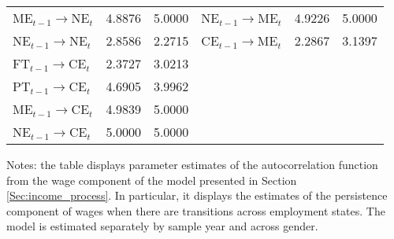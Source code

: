 \documentclass[12pt, a4paper]{article}
\begin{document}
\begin{table}[!htbp]
{{\begin{threeparttable}
\begin{tabular} {@{} l | c  c | l | c  c | @{}}
ME$_{t-1}$$\rightarrow$NE$_{t}$&4.8876	&5.0000&NE$_{t-1}$$\rightarrow$ME$_{t}$	&4.9226	&5.0000	\\[1mm]
NE$_{t-1}$$\rightarrow$NE$_{t}$&2.8586	&2.2715&CE$_{t-1}$$\rightarrow$ME$_{t}$	&2.2867	&3.1397	\\[1mm]
					\hline
FT$_{t-1}$$\rightarrow$CE$_{t}$&2.3727	&3.0213	&&&	\\[1mm]
PT$_{t-1}$$\rightarrow$CE$_{t}$&4.6905	&3.9962	&&&	\\[1mm]
ME$_{t-1}$$\rightarrow$CE$_{t}$&4.9839	&5.0000	&&&	\\[1mm]
NE$_{t-1}$$\rightarrow$CE$_{t}$&5.0000	&5.0000	&&&	\\[1mm]
\hline
				\end{tabular}
				\begin{tablenotes}
					\item {Notes: the table displays parameter estimates of the autocorrelation function from the wage component of the model presented in Section \ref{Sec:income_process}. In particular, it displays the estimates of the persistence component of wages when there are transitions across employment states. The model is estimated separately by sample year and across gender.} 
				\end{tablenotes}
	\end{threeparttable}}}
\end{table}
\end{document}
